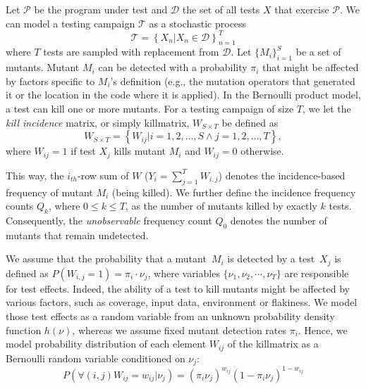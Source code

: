 \documentclass[sigconf,review,anonymous]{acmart}
\begin{document}
Let $\mathcal{P}$ be the program under test and $\mathcal{D}$ the set of all tests $X$ that exercise $\mathcal{P}$.
We can model a testing campaign $\mathcal{T}$ 
as a stochastic process
\[
    \mathcal{T}=\left\{ X_n|X_n \in \mathcal{D} \right\}_{n=1}^T
\]
where $T$ tests are sampled with replacement from $\mathcal{D}$.
Let $\{M_i\}_{i=1}^S$ be a set of mutants.
Mutant ${M_i}$ can be detected with a probability $\pi_i$ that
might be affected by factors specific to ${M_i}$'s definition (e.g.,
the mutation operators that generated it or the location in the code where it is applied).
%
In the Bernoulli product model, a test can kill one or more mutants.
For a testing campaign of size $T$, %
we let the \emph{kill incidence} matrix, or simply killmatrix, $W_{S\times T}$ be defined as
\[
    W_{S\times T} = \left\{W_{ij} |i=1,2,\dots,S\land j=1,2,\dots,T \right\},
\]
where $W_{ij} = 1$ if test $X_j$ kills mutant $M_i$ and $W_{ij} = 0$ otherwise.

This way, the $i_{th}$-row sum of $W$ ($Y_i=\sum_{j=1}^{T}W_{i,j}$) denotes the
incidence-based frequency of mutant $M_i$ (being killed).
We further define the incidence frequency counts $Q_k$, where $0 \leq k \leq T$, as the number of mutants killed by exactly $k$ tests.
Consequently, the \emph{unobservable} frequency count $Q_0$
denotes the number of mutants that remain undetected.

We assume that the probability that a mutant~$M_i$ is detected by a test~$X_j$ is defined as
$P(W_{i,j}=1) = \pi_{i} \cdot \nu_{j}$,
where variables $\{\nu_{1}, \nu_{2},\cdots,\nu_{T}\}$ are responsible for test effects.
Indeed, the ability of a test to kill mutants might be affected by various factors, such as coverage, input data, environment or flakiness.
We model those test effects as a random
variable from an unknown probability density function $h(\nu)$, whereas
we assume fixed mutant detection rates $\pi_i$.
%
Hence, we model probability distribution of each element $W_{ij}$ of the killmatrix as a Bernoulli random variable conditioned on $\nu_j$:
\small
\begin{displaymath}
    P(\forall (i,j) W_{ij}=w_{ij}|\nu_j)=(\pi_i \nu_j)^{w_{ij}}(1-\pi_i \nu_j)^{1-w_{ij}}
\end{displaymath}
\normalsize
\end{document}
